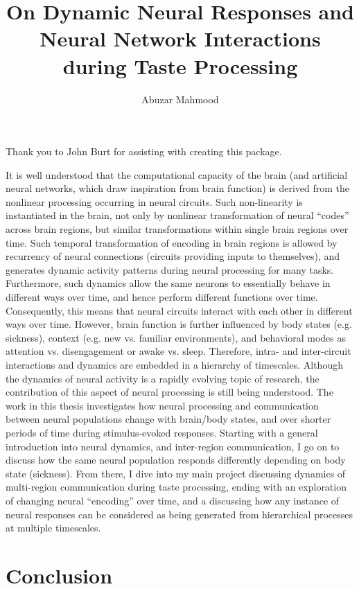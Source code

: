 \documentclass{brandeis-dissertation3.12}
\title{On Dynamic Neural Responses and Neural Network Interactions during Taste Processing}
\author{Abuzar Mahmood}
\begin{document}
\maketitlepage
\makeapproval
\makecopyright

\begin{dissertation-acknowledgements}
Thank you to John Burt for assisting with creating this package.
\end{dissertation-acknowledgements}

\begin{dissertation-abstract}
It is well understood that the computational capacity of the brain (and artificial neural networks, which draw inspiration from brain function) is derived from the nonlinear processing occurring in neural circuits. Such non-linearity is instantiated in the brain, not only by nonlinear transformation of neural “codes” across brain regions, but similar transformations within single brain regions over time. Such temporal transformation of encoding in brain regions is allowed by recurrency of neural connections (circuits providing inputs to themselves), and generates dynamic activity patterns during neural processing for many tasks. Furthermore, such dynamics allow the same neurons to essentially behave in different ways over time, and hence perform different functions over time. Consequently, this means that neural circuits interact with each other in different ways over time. However, brain function is further influenced by body states (e.g. sickness), context (e.g. new vs. familiar environments), and behavioral modes as attention vs. disengagement or awake vs. sleep. Therefore, intra- and inter-circuit interactions and dynamics are embedded in a hierarchy of timescales. 
Although the dynamics of neural activity is a rapidly evolving topic of research, the contribution of this aspect of neural processing is still being understood. The work in this thesis investigates how neural processing and communication between neural populations change with brain/body states, and over shorter periods of time during stimulus-evoked responses. Starting with a general introduction into neural dynamics, and inter-region communication, I go on to discuss how the same neural population responds differently depending on body state (sickness). From there, I dive into my main project discussing dynamics of multi-region communication during taste processing, ending with an exploration of changing neural “encoding” over time, and a discussing how any instance of neural responses can be considered as being generated from hierarchical processes at multiple timescales.
\end{dissertation-abstract}

\doublespacing

\tableofcontents

\startbody






\chapter{Conclusion}
\end{document}

